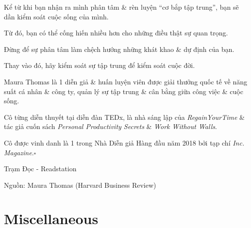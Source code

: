 \documentclass{article}
\begin{document}
Kể từ khi bạn nhận ra mình phân tâm \& rèn luyện ``cơ bắp tập trung'', bạn sẽ dần kiểm soát cuộc sống của mình.

Từ đó, bạn có thể cống hiến nhiều hơn cho những điều thật sự quan trọng.

Đừng để sự phân tâm làm chệch hướng những khát khao \& dự định của bạn.

Thay vào đó, hãy kiểm soát sự tập trung để kiểm soát cuộc đời.

%
Maura Thomas là 1 diễn giả \& huấn luyện viên được giải thưởng quốc tế về năng suất cá nhân \& công ty, quản lý sự tập trung \& cân bằng giữa công việc \& cuộc sống.

Cô từng diễn thuyết tại diễn đàn TEDx, là nhà sáng lập của \textit{RegainYourTime} \& tác giả cuốn sách \textit{Personal Productivity Secrets} \& \textit{Work Without Walls}.

Cô được vinh danh là 1 trong Nhà Diễn giả Hàng đầu năm 2018 bởi tạp chí \textit{Inc. Magazine}.\hfill$\square$
\begin{flushright}
	Trạm Đọc - Readstation
	
	Nguồn: Maura Thomas (Harvard Business Review)
\end{flushright}






\section{Miscellaneous}


\printbibliography[heading=bibintoc]
	
\end{document}
